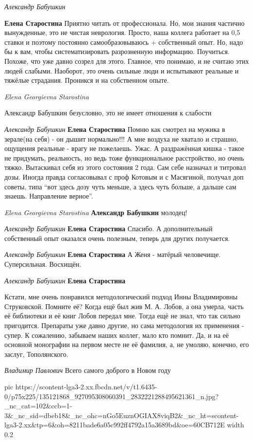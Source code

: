 \emph{Александр Бабушкин}

\textbf{Елена Старостина}
Приятно читать от профессионала. Но, мои знания частично вынужденные, это не
чистая неврология. Просто, наша коллега работает на 0,5 ставки и поэтому
постоянно самообразовываюсь + собственный опыт. Но, надо бы к вам, чтобы
систематизировать разрозненную информацию. Поучиться. Похоже, что уже давно
созрел для этого. Главное, что понимаю, и не считаю этих людей слабыми.
Наоборот, это очень сильные люди и испытывают реальные и тяжёлые страдания.
Проникся и на собственном опыте.

\emph{Elena Georgievna Starostina}

Александр Бабушкин безусловно, это не имеет отношения к слабости

\emph{Александр Бабушкин}
\textbf{Елена Старостина}
Помню как смотрел на мужика в зерале(на себя) - он дышит нормально!!! А мне
воздуха не хватало и страшно, ощущения реальные - врагу не пожелаешь. Ужас. А
раздражённая кишка - такое не придумать, реальность, но ведь тоже
функциональное расстройство, но очень тяжко. Вытаскивал себя из этого состояния
2 года. Сам себе назначал и титровал дозы. Иногда правда согласовывал с проф
Котовым и с Масягиной, получал доп советы, типа \enquote{вот здесь дозу чуть меньше, а
здесь чуть больше, а дальше сам знаешь. Направление верное}.

\emph{Elena Georgievna Starostina}
\textbf{Александр Бабушкин} молодец!

\emph{Александр Бабушкин}
\textbf{Елена Старостина} Спасибо. А дополнительный собственный опыт оказался
очень полезным, теперь для других получается.

\emph{Александр Бабушкин}
\textbf{Елена Старостина}
А Женя - матёрый человечище. Суперсильная. Восхищён.

\emph{Александр Бабушкин}
\textbf{Елена Старостина}

Кстати, мне очень понравился методологический подход Инны Владимировны
Струковской. Помните её? Когда ещё был жив М. А. Лобов, а она умерла, часть её
библиотеки и её книг Лобов передал мне. Тогда ещё не знал, что так сильно
пригодится. Препараты уже давно другие, но сама методология их применения -
супер. К сожалению, забываем наших коллег, мало кто помнит. Да, и на её
основной монографии на первом месте не её фамилия, а, не умоляю, конечно, его
заслуг, Тополянского.

\emph{Владимир Павлович}
Всего самого доброго в Новом году

\ifcmt
  pic https://scontent-lga3-2.xx.fbcdn.net/v/t1.6435-0/p75x225/135121868_927095308060391_2832221288495621361_n.jpg?_nc_cat=102&ccb=1-3&_nc_sid=dbeb18&_nc_ohc=nGo5EuznOGIAX8viqB2&_nc_ht=scontent-lga3-2.xx&tp=6&oh=8211bade6a05c992ff4792a15a3689bd&oe=60CB712E
	width 0.2
\fi

